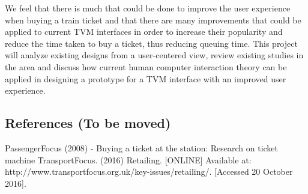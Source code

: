 We feel that there is much that could be done to improve the user experience when buying a train ticket and that there are many improvements that could be applied to current TVM interfaces in order to increase their popularity and reduce the time taken to buy a ticket, thus reducing queuing time. This project will analyze existing designs from a user-centered view, review existing studies in the area and discuss how current human computer interaction theory can be applied in designing a prototype for a TVM interface with an improved user experience.

\subsection{References (To be moved)} 
PassengerFocus (2008) - Buying a ticket at the station: Research on ticket machine 
TransportFocus. (2016) Retailing. [ONLINE] Available at: http://www.transportfocus.org.uk/key-issues/retailing/. [Accessed 20 October 2016]. 
